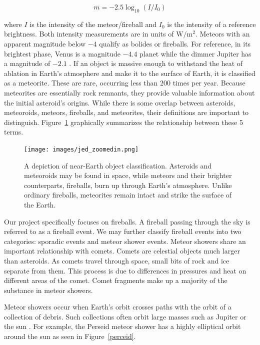 \begin{equation}
m = -2.5 \log_{10}(I/I_0)
\label{magnitude_equation}
\end{equation}

 
where $I$ is the intensity of the meteor/fireball and $I_0$ is the intensity of a reference brightness.  
Both intensity measurements are in units of $\si{\watt/\meter^2}$.
Meteors with an apparent magnitude below $-4$ qualify as bolides or fireballs.
For reference, in its brightest phase, Venus is a magnitude $-4.4$ planet while the dimmer Jupiter has a magnitude of $-2.1$ \cite{rao_venus_nodate}.
If an object is massive enough to withstand the heat of ablation in Earth's atmosphere and make it to the surface of Earth, it is classified as a meteorite. 
These are rare, occurring less than $200$ times per year.
Because meteorites are essentially rock remnants, they provide valuable information about the initial asteroid's origins.
While there is some overlap between asteroids, meteoroids, meteors, fireballs, and meteorites, their definitions are important to distinguish.
Figure~\ref{jed} graphically summarizes the relationship between these 5 terms.

\begin{figure}[ht!]
  \centering
  \texttt{[image: images/jed\_zoomedin.png]}
  \caption[A depiction of near-Earth object classification.]{A depiction of near-Earth object classification.  Asteroids and meteoroids may be found in space, while meteors and their brighter counterparts, fireballs, burn up through Earth's atmosphere.  Unlike ordinary fireballs, meteorites remain intact and strike the surface of the Earth.}
  \label{jed}
\end{figure}

Our project specifically focuses on fireballs.
A fireball passing through the sky is referred to as a fireball event.
We may further classify fireball events into two categories: sporadic events and meteor shower events.
Meteor showers share an important relationship with comets.
Comets are celestial objects much larger than asteroids.
As comets travel through space, small bits of rock and ice separate from them.
This process is due to differences in pressures and heat on different areas of the comet.
Comet fragments make up a majority of the substance in meteor showers.


Meteor showers occur when Earth's orbit crosses paths with the orbit of a collection of debris. 
Such collections often orbit large masses such as Jupiter or the sun \cite{trigo-rodriguez_2006_2007}.
For example, the Perseid meteor shower has a highly elliptical orbit around the sun as seen in Figure~\ref{perceid}.  

